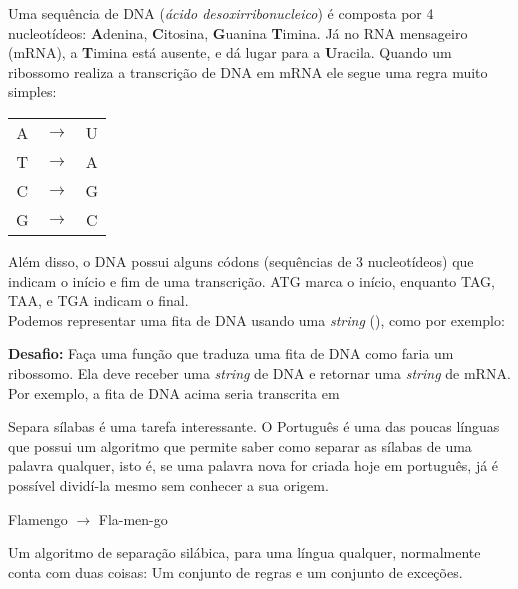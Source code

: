 \documentclass[12pt]{article}
\begin{document}
	
	
	Uma sequência de DNA (\emph{ácido desoxirribonucleico}) é composta por 4 nucleotídeos: \textbf{A}denina, \textbf{C}itosina, \textbf{G}uanina \textbf{T}imina. Já no RNA mensageiro (mRNA), a \textbf{T}imina está ausente, e dá lugar para a \textbf{U}racila. Quando um ribossomo realiza a transcrição de DNA em mRNA ele segue uma regra muito simples:
		
	\begin{center}
			\begin{tabular}{ccc}
				A & $\rightarrow$ & U\\
				T & $\rightarrow$ & A\\
				C & $\rightarrow$ & G\\
				G & $\rightarrow$ & C\\
			\end{tabular}
	\end{center}
	
	Além disso, o DNA possui alguns códons (sequências de 3 nucleotídeos) que indicam o início e fim de uma transcrição. ATG marca o início, enquanto TAG, TAA, e TGA indicam o final.\\
	
	Podemos representar uma fita de DNA usando uma \emph{string} (), como por exemplo:
	\begin{center}
	\end{center}
	
	\textbf{Desafio:} Faça uma função que traduza uma fita de DNA como faria um ribossomo. Ela deve receber uma \textit{string} de DNA e retornar uma \textit{string} de mRNA. Por exemplo, a fita de DNA acima seria transcrita em
	\begin{center}
	\end{center}
	
	
	
	Separa sílabas é uma tarefa interessante. O Português é uma das poucas línguas que possui um algoritmo que permite saber como separar as sílabas de uma palavra qualquer, isto é, se uma palavra nova for criada hoje em português, já é possível dividí-la mesmo sem conhecer a sua origem.
	
	\begin{center}
		Flamengo $\to$ Fla-men-go
	\end{center}
	
	Um algoritmo de separação silábica, para uma língua qualquer, normalmente conta com duas coisas: Um conjunto de regras e um conjunto de exceções.\\
	
\end{document}
